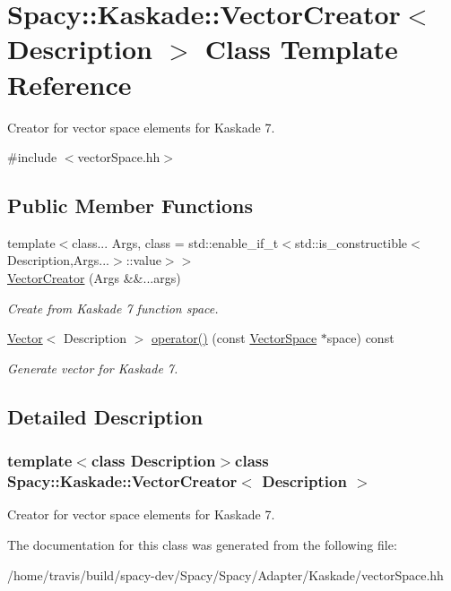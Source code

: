\hypertarget{classSpacy_1_1Kaskade_1_1VectorCreator}{\section{\-Spacy\-:\-:\-Kaskade\-:\-:\-Vector\-Creator$<$ \-Description $>$ \-Class \-Template \-Reference}
\label{classSpacy_1_1Kaskade_1_1VectorCreator}
}


\-Creator for vector space elements for \-Kaskade 7.  




{\ttfamily \#include $<$vector\-Space.\-hh$>$}

\subsection*{\-Public \-Member \-Functions}
\begin{DoxyCompactItemize}
\item 
{\footnotesize template$<$class... \-Args, class  = std\-::enable\-\_\-if\-\_\-t$<$std\-::is\-\_\-constructible$<$\-Description,\-Args...$>$\-::value$>$$>$ }\\\hyperlink{group__VectorSpaceGroup_ga89de372343310640870077e6167df3f4}{\-Vector\-Creator} (\-Args \&\&...args)
\begin{DoxyCompactList}\small\item\em \-Create from \-Kaskade 7 function space. \end{DoxyCompactList}\item 
\hypertarget{classSpacy_1_1Kaskade_1_1VectorCreator_aaceaab9c73fe2738c9f32eae99953f97}{\hyperlink{classSpacy_1_1Kaskade_1_1Vector}{\-Vector}$<$ \-Description $>$ \hyperlink{classSpacy_1_1Kaskade_1_1VectorCreator_aaceaab9c73fe2738c9f32eae99953f97}{operator()} (const \hyperlink{classSpacy_1_1VectorSpace}{\-Vector\-Space} $\ast$space) const }\label{classSpacy_1_1Kaskade_1_1VectorCreator_aaceaab9c73fe2738c9f32eae99953f97}

\begin{DoxyCompactList}\small\item\em \-Generate vector for \-Kaskade 7. \end{DoxyCompactList}\end{DoxyCompactItemize}


\subsection{\-Detailed \-Description}
\subsubsection*{template$<$class Description$>$class Spacy\-::\-Kaskade\-::\-Vector\-Creator$<$ Description $>$}

\-Creator for vector space elements for \-Kaskade 7. 

\-The documentation for this class was generated from the following file\-:\begin{DoxyCompactItemize}
\item 
/home/travis/build/spacy-\/dev/\-Spacy/\-Spacy/\-Adapter/\-Kaskade/vector\-Space.\-hh\end{DoxyCompactItemize}
